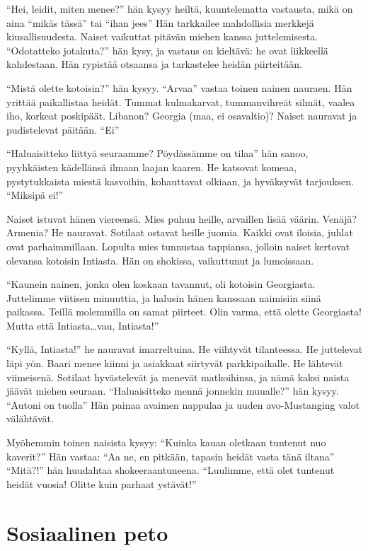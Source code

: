 \begin{tarina}
``Hei, leidit, miten menee?'' hän kysyy heiltä, kuuntelematta vastausta, mikä on aina ``mikäs tässä'' tai ``ihan jees'' Hän tarkkailee mahdollisia merkkejä kiusallisuudesta. Naiset vaikuttat pitävän miehen kanssa juttelemisesta. ``Odotatteko jotakuta?'' hän kysy, ja vastaus on kieltävä: he ovat liikkeellä kahdestaan. Hän rypistää otsaansa ja tarkastelee heidän piirteitään.

``Mistä olette kotoisin?'' hän kysyy. ``Arvaa\vmq{,}'' vastaa toinen nainen nauraen. Hän yrittää paikallistaa heidät. Tummat kulmakarvat, tummanvihreät silmät, vaalea iho, korkeat poskipäät. Libanon? Georgia (maa, ei osavaltio)? Naiset nauravat ja pudistelevat päitään. ``Ei''

``Haluaisitteko liittyä seuraamme? Pöydässämme on tilaa\vmq{,}'' hän sanoo, pyyhkäisten kädellänsä ilmaan laajan kaaren. He katsovat komeaa, pystytukkaista miestä kasvoihin, kohauttavat olkiaan, ja hyväksyvät tarjouksen. ``Miksipä ei!''

Naiset istuvat hänen viereensä. Mies puhuu heille, arvaillen lisää väärin. Venäjä? Armenia? He nauravat. Sotilaat ostavat heille juomia. Kaikki ovat iloisia, juhlat ovat parhaimmillaan. Lopulta mies tunnustaa tappiansa, jolloin naiset kertovat olevansa kotoisin Intiasta. Hän on shokissa, vaikuttunut ja lumoissaan.

``Kaunein nainen, jonka olen koskaan tavannut, oli kotoisin Georgiasta. Juttelimme viitisen minuuttia, ja halusin hänen kanssaan naimisiin siinä paikassa. Teillä molemmilla on samat piirteet. Olin varma, että olette Georgiasta! Mutta että Intiasta\ldots vau, Intiasta!''

``Kyllä, Intiasta!'' he nauravat imarreltuina. He viihtyvät tilanteessa. He juttelevat läpi yön. Baari menee kiinni ja asiakkaat siirtyvät parkkipaikalle. He lähtevät viimeisenä. Sotilaat hyvästelevät ja menevät matkoihinsa, ja nämä kaksi naista jäävät miehen seuraan. ``Haluaisitteko mennä jonnekin muualle?'' hän kysyy. ``Autoni on tuolla'' Hän painaa avaimen nappulaa ja uuden avo-Mustanging valot välähtävät.

Myöhemmin toinen naisista kysyy: ``Kuinka kauan oletkaan tuntenut nuo kaverit?'' Hän vastaa: ``Aa ne, en pitkään, tapasin heidät vasta tänä iltana'' ``Mitä?!'' hän huudahtaa shokeeraantuneena. ``Luulimme, että olet tuntenut heidät vuosia! Olitte kuin parhaat ystävät!''

\end{tarina}

\section{Sosiaalinen peto}

